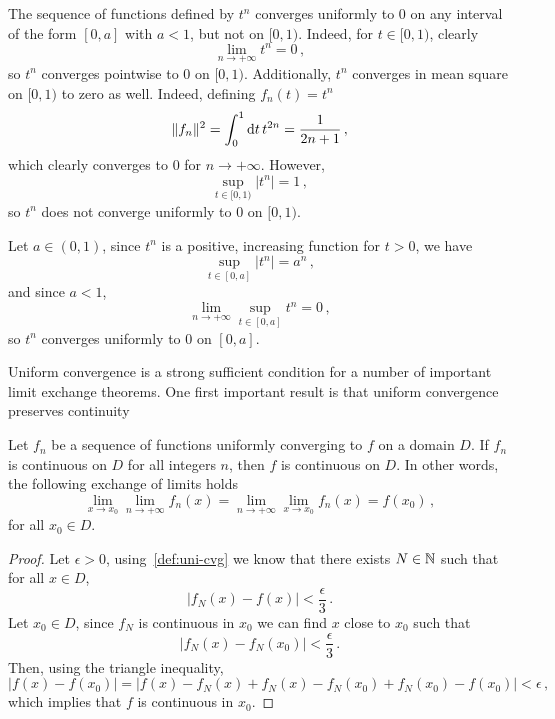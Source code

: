 \begin{example}
  The sequence of functions defined by $t^n$ converges uniformly to $0$ on any interval of
  the form $[0,a]$ with $a<1$, but not on $[0,1)$. Indeed, for $t\in [0,1)$, clearly
  \begin{equation}
    \lim_{n\to+\infty}t^n=0\,,
  \end{equation}
  so $t^n$ converges pointwise to $0$ on $[0,1)$. Additionally, $t^n$ converges in mean
  square on $[0,1)$ to zero as well. Indeed, defining $f_n(t)=t^n$
  \begin{equation}
    \|f_n\|^2=\int_0^1\mathrm{d} t\,t^{2n}=\frac{1}{2n+1}\,,
  \end{equation}
  which clearly converges to $0$ for $n\to+\infty$. However,
  \begin{equation}
    \sup_{t\in[0,1)}|t^n|=1\,,
  \end{equation}
  so $t^n$ does not converge uniformly to $0$ on $[0,1)$.

  Let $a\in(0,1)$, since $t^n$ is a positive, increasing function for $t>0$, we have
  \begin{equation}
    \sup_{t\in[0,a]}|t^n|=a^n\,,
  \end{equation}
  and since $a<1$,
  \begin{equation}
    \lim_{n\to+\infty}\sup_{t\in[0,a]}t^n=0\,,
  \end{equation}
  so $t^n$ converges uniformly to $0$ on $[0,a]$.
\end{example}
Uniform convergence is a strong sufficient condition for a number of important limit
exchange theorems. One first important result is that uniform convergence preserves
continuity
\begin{theorem}
  \label{thm:uniconv-continuous}
  Let $f_n$ be a sequence of functions uniformly converging to $f$ on a domain $D$. If
  $f_n$ is continuous on $D$ for all integers $n$, then $f$ is continuous on $D$. In other
  words, the following exchange of limits holds
  \begin{equation}
    \lim_{x\to x_0}\lim_{n\to+\infty}f_n(x)=\lim_{n\to+\infty}\lim_{x\to x_0}f_n(x)=f(x_0)\,,
  \end{equation}
  for all $x_0\in D$.
\end{theorem}
\begin{proof}
  Let $\epsilon>0$, using~\cref{def:uni-cvg} we know that there exists $N\in\mathbb{N}$ such that
  for all $x\in D$,
  \begin{equation}
    |f_N(x)-f(x)|<\frac{\epsilon}{3}\,.
  \end{equation}
  Let $x_0\in D$, since $f_N$ is continuous in $x_0$ we can find $x$ close to $x_0$ such
  that
  \begin{equation}
    |f_N(x)-f_N(x_0)|<\frac{\epsilon}{3}\,.
  \end{equation}
  Then, using the triangle inequality,
  \begin{equation}
    |f(x)-f(x_0)|=|f(x)-f_N(x)+f_N(x)-f_N(x_0)+f_N(x_0)-f(x_0)|<\epsilon\,,
  \end{equation}
  which implies that $f$ is continuous in $x_0$.
\end{proof}

